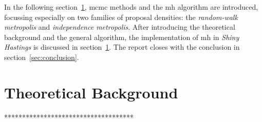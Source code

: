 \documentclass[11pt]{article}
\begin{document}
In the following section~\ref{sec:mh}, \gls{mcmc} methods and the \gls{mh} algorithm are introduced, focussing especially on two families of proposal densities: the \textit{random-walk metropolis} and \textit{independence metropolis}. After introducing the theoretical background and the general algorithm, the implementation of \gls{mh} in \textit{Shiny Hastings} is discussed in section~\ref{sec:mh}. The report closes with the conclusion in section~\ref{sec:conclusion}.






%

%



\section{Theoretical Background}\label{sec:mh}
************************************
\end{document}
